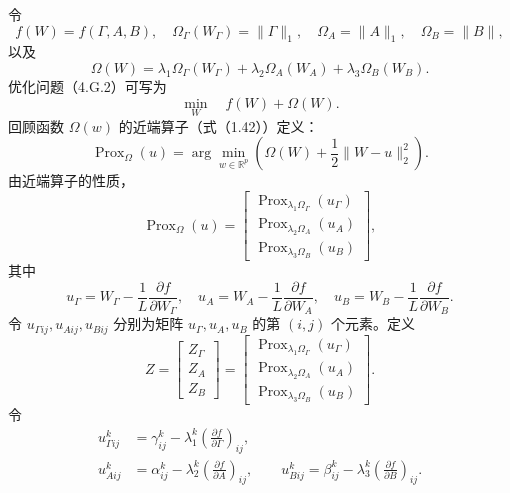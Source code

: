 令
\[
f(W)=f(\Gamma,A,B),\quad
\Omega_\Gamma(W_\Gamma)=\|\Gamma\|_1,\quad
\Omega_A=\|A\|_1,\quad\Omega_B=\|B\|,
\]
以及
\[
\Omega(W)=\lambda_1\Omega_\Gamma(W_\Gamma)
+\lambda_2\Omega_A(W_A)+\lambda_3\Omega_B(W_B).
\]
优化问题（4.G.2）可写为
\begin{equation}
\min_W\quad f(W)+\Omega(W).\tag{4.G.13}
\end{equation}
回顾函数 $\Omega(w)$ 的近端算子（式（1.42））定义：
\begin{equation}
\operatorname{Prox}_\Omega(u)=\arg\min_{w\in\mathbb R^p}
\left(\Omega(W)+\frac12\|W-u\|_2^2\right).\tag{4.G.14}
\end{equation}
由近端算子的性质，
\begin{equation}
\operatorname{Prox}_\Omega(u)=\begin{bmatrix}
\operatorname{Prox}_{\lambda_1\Omega_\Gamma}(u_\Gamma)\\
\operatorname{Prox}_{\lambda_2\Omega_A}(u_A)\\
\operatorname{Prox}_{\lambda_3\Omega_B}(u_B)
\end{bmatrix},\tag{4.G.15}
\end{equation}
其中
\begin{equation}
u_\Gamma=W_\Gamma-\frac1L\frac{\partial f}{\partial W_\Gamma},\quad
u_A=W_A-\frac1L\frac{\partial f}{\partial W_A},\quad
u_B=W_B-\frac1L\frac{\partial f}{\partial W_B}.\tag{4.G.16}
\end{equation}
令 $u_{\Gamma ij},u_{Aij},u_{Bij}$ 分别为矩阵 $u_\Gamma,u_A,u_B$ 的第 $(i,j)$ 个元素。定义
\begin{equation}
Z=\begin{bmatrix}Z_\Gamma\\Z_A\\Z_B\end{bmatrix}
=\begin{bmatrix}
\operatorname{Prox}_{\lambda_1\Omega_\Gamma}(u_\Gamma)\\
\operatorname{Prox}_{\lambda_2\Omega_A}(u_A)\\
\operatorname{Prox}_{\lambda_3\Omega_B}(u_B)
\end{bmatrix}.\tag{4.G.17}
\end{equation}
令
\[
\begin{aligned}
u_{\Gamma ij}^k&=\gamma_{ij}^k-\lambda_1^k\left(\frac{\partial f}{\partial\Gamma}\right)_{ij},\\
u_{Aij}^k&=\alpha_{ij}^k-\lambda_2^k\left(\frac{\partial f}{\partial A}\right)_{ij},\qquad
u_{Bij}^k=\beta_{ij}^k-\lambda_3^k\left(\frac{\partial f}{\partial B}\right)_{ij}.
\end{aligned}
\]
